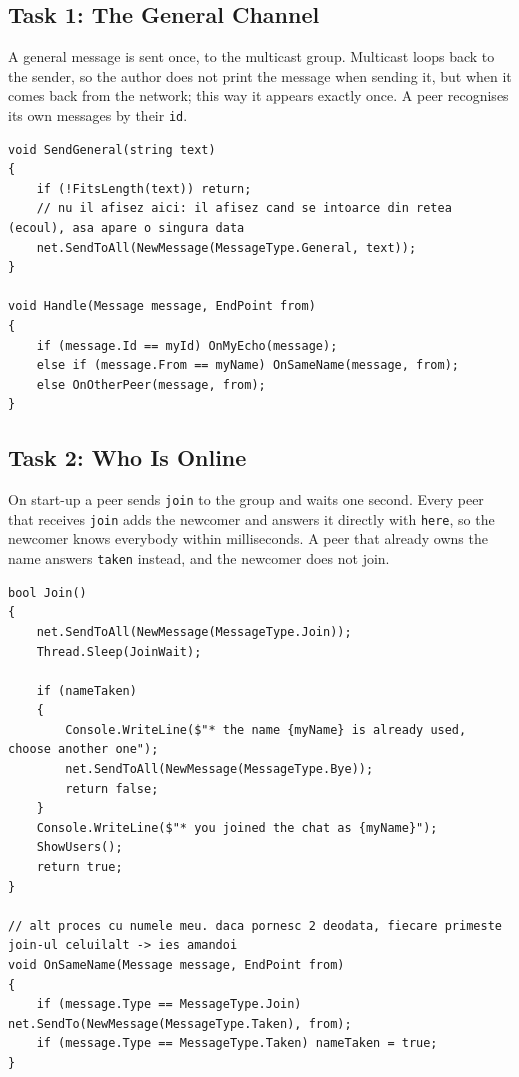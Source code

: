 \documentclass[11pt, a4paper]{article}
\begin{document}
\subsection{Task 1: The General Channel}
A general message is sent once, to the multicast group. Multicast loops back to the sender, so the author does not print the message when sending it, but when it comes back from the network; this way it appears exactly once. A peer recognises its own messages by their \texttt{id}.

\begin{lstlisting}[caption={Sending and dispatching messages (\texttt{Chat.cs})}]
void SendGeneral(string text)
{
    if (!FitsLength(text)) return;
    // nu il afisez aici: il afisez cand se intoarce din retea (ecoul), asa apare o singura data
    net.SendToAll(NewMessage(MessageType.General, text));
}

void Handle(Message message, EndPoint from)
{
    if (message.Id == myId) OnMyEcho(message);
    else if (message.From == myName) OnSameName(message, from);
    else OnOtherPeer(message, from);
}
\end{lstlisting}

\subsection{Task 2: Who Is Online}
On start-up a peer sends \texttt{join} to the group and waits one second. Every peer that receives \texttt{join} adds the newcomer and answers it directly with \texttt{here}, so the newcomer knows everybody within milliseconds. A peer that already owns the name answers \texttt{taken} instead, and the newcomer does not join.

\begin{lstlisting}[caption={Joining and keeping the names unique}]
bool Join()
{
    net.SendToAll(NewMessage(MessageType.Join));
    Thread.Sleep(JoinWait);

    if (nameTaken)
    {
        Console.WriteLine($"* the name {myName} is already used, choose another one");
        net.SendToAll(NewMessage(MessageType.Bye));
        return false;
    }
    Console.WriteLine($"* you joined the chat as {myName}");
    ShowUsers();
    return true;
}

// alt proces cu numele meu. daca pornesc 2 deodata, fiecare primeste join-ul celuilalt -> ies amandoi
void OnSameName(Message message, EndPoint from)
{
    if (message.Type == MessageType.Join) net.SendTo(NewMessage(MessageType.Taken), from);
    if (message.Type == MessageType.Taken) nameTaken = true;
}
\end{lstlisting}
\end{document}
